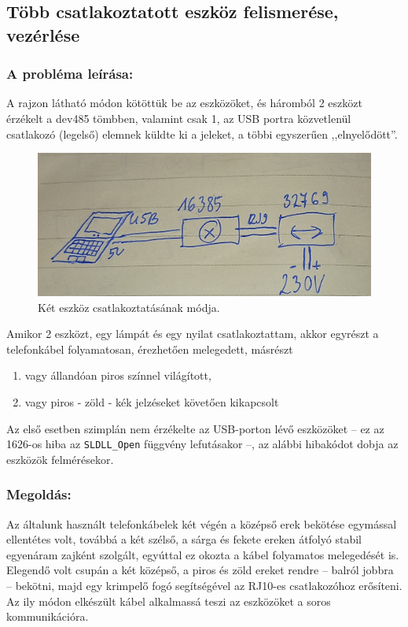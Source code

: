 \documentclass[tocnopagenum]{thesis-ekf}
\theoremstyle{definition}
\theoremstyle{remark}
\begin{document}
	\subsection{Több csatlakoztatott eszköz felismerése, vezérlése}
	\subsubsection{A probléma leírása:}
	A rajzon látható módon kötöttük be az eszközöket, és háromból 2 eszközt érzékelt a dev485 tömbben, valamint csak 1, az USB portra közvetlenül csatlakozó (legelső) elemnek küldte ki a jeleket, a többi egyszerűen ,,elnyelődött''.		\begin{figure}[h!]
		\centering
		\includegraphics[scale=0.4]{images/kezi1.jpg}
		\caption{Két eszköz csatlakoztatásának módja.}
		\label{fig:kezi1}
	\end{figure}	
	
	Amikor 2 eszközt, egy lámpát és egy nyilat csatlakoztattam, akkor egyrészt a telefonkábel folyamatosan, érezhetően melegedett, másrészt 
	\renewcommand{\labelenumi}{\alph{enumi})}
	\begin{enumerate}
		\item vagy állandóan piros színnel világított, 
		\item vagy piros - zöld - kék jelzéseket követően kikapcsolt
	\end{enumerate}
	Az első esetben szimplán nem érzékelte az USB-porton lévő eszközöket -- ez az 1626-os hiba az \verb*|SLDLL_Open| függvény lefutásakor --, az alábbi hibakódot dobja az eszközök felmérésekor.


	\subsubsection{Megoldás:} Az általunk használt telefonkábelek két végén a középső erek bekötése egymással ellentétes volt, továbbá a két szélső, a sárga és fekete ereken átfolyó stabil egyenáram zajként szolgált, egyúttal ez okozta a kábel folyamatos melegedését is. Elegendő volt csupán a két középső, a piros és zöld ereket rendre -- balról jobbra --  bekötni, majd egy krimpelő fogó segítségével az RJ10-es csatlakozóhoz erősíteni. Az ily módon elkészült kábel alkalmassá teszi az eszközöket a soros kommunikációra.
	
\end{document}
